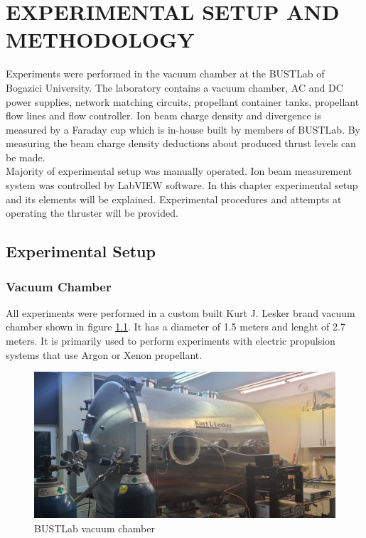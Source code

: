 \chapter{EXPERIMENTAL SETUP AND METHODOLOGY}\label{Ch:Ch4_expsetup}
Experiments were performed in the vacuum chamber at the BUSTLab of Bogazici University. The laboratory contains a vacuum chamber, AC and DC power supplies, network matching circuits, propellant container tanks, propellant flow lines and flow controller. Ion beam charge density and divergence is measured by a Faraday cup which is in-house built by members of BUSTLab\cite{yildiz2019plume}. By measuring the beam charge density deductions about produced thrust levels can be made. \\
Majority of experimental setup was manually operated. Ion beam measurement system was controlled by LabVIEW software. In this chapter experimental setup and its elements will be explained. Experimental procedures and attempts at operating the thruster will be provided. 

\section{Experimental Setup}
\newpage
\subsection{Vacuum Chamber}
All experiments were performed in a custom built Kurt J. Lesker brand vacuum chamber shown in figure \ref{fig:bustlabchamber}. It has a diameter of 1.5 meters and lenght of 2.7 meters. It is primarily used to perform experiments with electric propulsion systems that use Argon or Xenon propellant. \\
\begin{figure}[ht]
    \centering
    \includegraphics[scale=0.1]{fig/bustlabchamber.jpg}
    \caption{BUSTLab vacuum chamber}
    \label{fig:bustlabchamber}
\end{figure}

